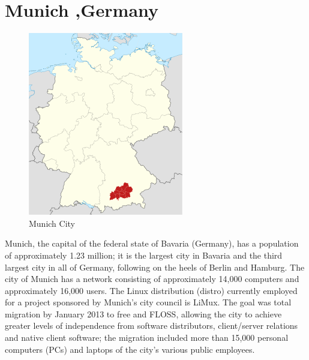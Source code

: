 \section {Munich ,Germany  }
\begin{figure}[H]
\centering
    \includegraphics[scale=0.8]{img/munich.png} 
  \caption{ Munich City}
    \end{figure}

Munich, the capital of the federal state of Bavaria (Germany), has a population of approximately 1.23 million; it is the largest city in Bavaria and the third largest city in all of Germany, following on the heels of Berlin and Hamburg. The city of Munich has a network consisting of approximately 14,000 computers and approximately 16,000 users. The Linux distribution (distro) currently employed for a project sponsored by Munich’s city council is LiMux. The goal was total migration by January 2013 to free and FLOSS, allowing the city to achieve greater levels of independence from software distributors, client/server relations and native client software; the migration included more than 15,000 personal computers (PCs) and laptops of the city’s various public employees.

